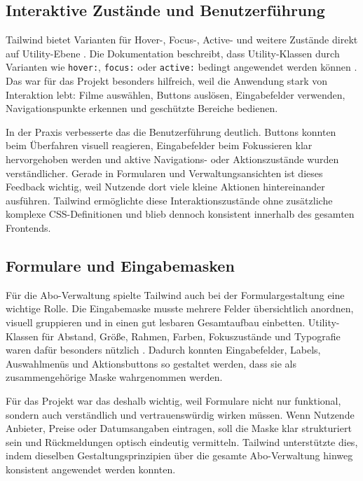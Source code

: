 \subsection{Interaktive Zust\"ande und Benutzerf\"uhrung}
Tailwind bietet Varianten f\"ur Hover-, Focus-, Active- und weitere Zust\"ande direkt auf Utility-Ebene \cite{tailwind_states}. Die Dokumentation beschreibt, dass Utility-Klassen durch Varianten wie \texttt{hover:}, \texttt{focus:} oder \texttt{active:} bedingt angewendet werden k\"onnen \cite{tailwind_states}. Das war f\"ur das Projekt besonders hilfreich, weil die Anwendung stark von Interaktion lebt: Filme ausw\"ahlen, Buttons ausl\"osen, Eingabefelder verwenden, Navigationspunkte erkennen und gesch\"utzte Bereiche bedienen.

In der Praxis verbesserte das die Benutzerf\"uhrung deutlich. Buttons konnten beim \"Uberfahren visuell reagieren, Eingabefelder beim Fokussieren klar hervorgehoben werden und aktive Navigations- oder Aktionszust\"ande wurden verst\"andlicher. Gerade in Formularen und Verwaltungsansichten ist dieses Feedback wichtig, weil Nutzende dort viele kleine Aktionen hintereinander ausf\"uhren. Tailwind erm\"oglichte diese Interaktionszust\"ande ohne zus\"atzliche komplexe CSS-Definitionen und blieb dennoch konsistent innerhalb des gesamten Frontends.

\subsection{Formulare und Eingabemasken}
F\"ur die Abo-Verwaltung spielte Tailwind auch bei der Formulargestaltung eine wichtige Rolle. Die Eingabemaske musste mehrere Felder \"ubersichtlich anordnen, visuell gruppieren und in einen gut lesbaren Gesamtaufbau einbetten. Utility-Klassen f\"ur Abstand, Gr\"o\ss{}e, Rahmen, Farben, Fokuszust\"ande und Typografie waren daf\"ur besonders n\"utzlich \cite{tailwind_utility,tailwind_states}. Dadurch konnten Eingabefelder, Labels, Auswahlmen\"us und Aktionsbuttons so gestaltet werden, dass sie als zusammengeh\"orige Maske wahrgenommen werden.

F\"ur das Projekt war das deshalb wichtig, weil Formulare nicht nur funktional, sondern auch verst\"andlich und vertrauensw\"urdig wirken m\"ussen. Wenn Nutzende Anbieter, Preise oder Datumsangaben eintragen, soll die Maske klar strukturiert sein und R\"uckmeldungen optisch eindeutig vermitteln. Tailwind unterst\"utzte dies, indem dieselben Gestaltungsprinzipien \"uber die gesamte Abo-Verwaltung hinweg konsistent angewendet werden konnten.

